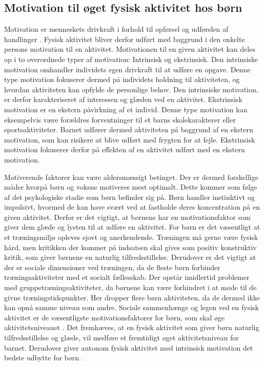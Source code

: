 \subsection{Motivation til øget fysisk aktivitet hos børn} \label{motivation_boern}
Motivation er menneskets drivkraft i forhold til opførsel og udførslen af handlinger \citep{V.Brown2007}. Fysisk aktivitet bliver derfor udført med baggrund i den enkelte persons motivation til en aktivitet. Motivationen til en given aktivitet kan deles op i to overordnede typer af motivation: Intrinsisk og ekstrinsisk. \citep{J.Sebire2013} \newline
Den intrinsiske motivation omhandler individets egen drivkraft til at udføre en opgave. Denne type motivation fokuserer dermed på individets holdning til aktiviteten, og hvordan aktiviteten kan opfylde de personlige behov. Den intrinsiske motivation, er derfor karakteriseret af interessen og glæden ved en aktivitet. \citep{J.Sebire2013} \newline
Ekstrinsisk motivation er en ekstern påvirkning af et individ. Denne type motivation kan eksempelvis være forældres forventninger til et barns skolekarakterer eller sportsaktiviteter. Barnet udfører dermed aktiviteten på baggrund af en ekstern motivation, som kan risikere at blive udført med frygten for at fejle. Ekstrinsisk motivation fokuserer derfor på effekten af en aktivitet udført med en ekstern motivation. \citep{J.Sebire2013} 

Motiverende faktorer kan være aldersmæssigt betinget. Der er dermed forskellige måder hvorpå børn og voksne motiveres mest optimalt. Dette kommer som følge af det psykologiske stadie som børn befinder sig på.  \newline
Børn handler instinktivt og impulsivt, hvormed de kan have svært ved at fastholde deres koncentration på en given aktivitet. Derfor er det vigtigt, at børnene har en motivationsfaktor som giver dem glæde og lysten til at udføre en aktivitet. \citep{V.Brown2007} \newline
For børn er det væsentligt at et træningsmiljø opleves sjovt og anerkendende. Træningen må gerne være fysisk hård, men kritikken der kommer på indsatsen skal gives som positiv konstruktiv kritik, som giver børnene en naturlig tilfredsstillelse. Derudover er det vigtigt at der er sociale dimensioner ved træningen, da de fleste børn forbinder træningsaktiviteter med et socialt fællesskab. Der opstår imidlertid problemer med gruppetræningsaktiviteter, da børnene kan være forhindret i at møde til de givne træningstidspunkter. Her dropper flere børn aktiviteten, da de dermed ikke kan opnå samme niveau som andre. \citep{Wied2011,Romani2013}\newline
Sociale sammenhænge og legen ved en fysisk aktivitet er de væsentligste motivationsfaktorer for børn, som skal øge aktivitetsniveauet \citep{McWhorter2003,J.Sebire2013}. Det fremhæves, at en fysisk aktivitet som giver børn naturlig tilfredsstillelse og glæde, vil medføre et fremtidigt øget aktivitetsniveau for barnet. Derudover giver autonom fysisk aktivitet med intrinsisk motivation det bedste udbytte for børn \citep{J.Sebire2013}.

